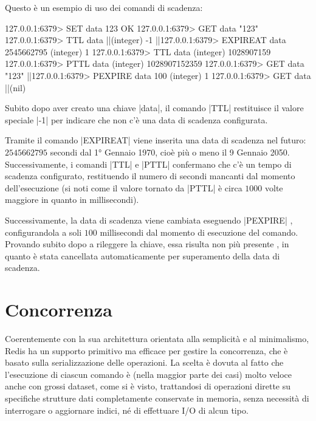 Questo è un esempio di uso dei comandi di scadenza:

\begin{commentedsource}[style=redis]
127.0.0.1:6379> SET data 123
OK
127.0.0.1:6379> GET data
"123"
127.0.0.1:6379> TTL data
|\lnote|(integer) -1
|\lnote|127.0.0.1:6379> EXPIREAT data 2545662795
(integer) 1
127.0.0.1:6379> TTL data
(integer) 1028907159
127.0.0.1:6379> PTTL data
(integer) 1028907152359
127.0.0.1:6379> GET data
"123"
|\lnote|127.0.0.1:6379> PEXPIRE data 100
(integer) 1
127.0.0.1:6379> GET data
|\lnote|(nil)
\end{commentedsource}

Subito dopo aver creato una chiave \cverb|data|, il comando \cverb|TTL| restituisce il valore
speciale \cverb|-1|  per indicare che non c'è una data di scadenza configurata. 

Tramite il comando \cverb|EXPIREAT|  viene inserita una data di scadenza nel futuro:
$\num{2545662795}$ secondi dal 1° Gennaio 1970, cioè più o meno il 9 Gennaio 2050. Successivamente,
i comandi \cverb|TTL| e \cverb|PTTL| confermano che c'è un tempo di scadenza configurato, restituendo
il numero di secondi mancanti dal momento dell'esecuzione (si noti come il valore tornato da
\cverb|PTTL| è circa $1000$ volte maggiore in quanto in millisecondi).

Successivamente, la data di scadenza viene cambiata eseguendo \cverb|PEXPIRE| ,
configurandola a soli $\num{100}$ millisecondi dal momento di esecuzione del comando. Provando
subito dopo a rileggere la chiave, essa risulta non più presente , in quanto è stata
cancellata automaticamente per superamento della data di scadenza.

\section{Concorrenza}
\label{sec:redis:concurrency}

Coerentemente con la sua architettura orientata alla semplicità e al minimalismo, Redis ha un
supporto primitivo ma efficace per gestire la concorrenza, che è basato sulla serializzazione delle
operazioni. La scelta è dovuta al fatto che l'esecuzione di ciascun comando è (nella maggior parte
dei casi) molto veloce anche con grossi dataset, come si è visto, trattandosi di operazioni dirette
su specifiche strutture dati completamente conservate in memoria, senza necessità di interrogare o
aggiornare indici, né di effettuare I/O di alcun tipo.

